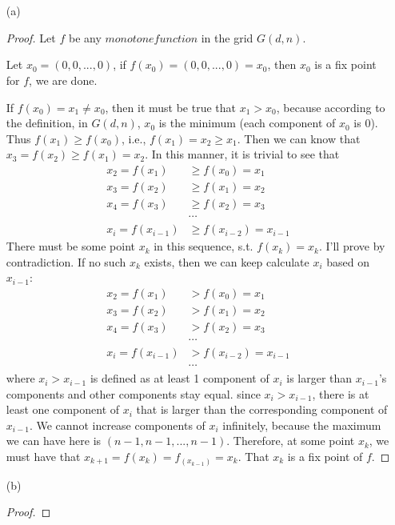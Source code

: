 \documentclass[twoside]{homework}
\begin{document}
\section{}
\begin{enumerate}
	\item [(a)]
	\begin{proof}
		Let $f$ be any $monotone function$ in the grid $G(d, n)$.

		Let $x_0 = (0, 0, ...,0)$, if $f(x_0) = (0,0,...,0) = x_0$, then $x_0$ is a fix point for $f$, we are done.

		If $f(x_0) = x_1 \neq x_0$, then it must be true that $x_1 > x_0$, because according to the definition, in $G(d, n)$, $x_0$ is the minimum (each component of $x_0$ is 0). Thus $f(x_1) \geq f(x_0)$, i.e., $f(x_1) = x_2 \geq x_1$. Then we can know that $x_3 = f(x_2) \geq f(x_1) = x_2$. In this manner, it is trivial to see that
		\begin{align*}
			x_2 = f(x_1) &\geq f(x_0) = x_1 \\
			x_3 = f(x_2) &\geq f(x_1) = x_2 \\
			x_4 = f(x_3) &\geq f(x_2) = x_3 \\
				&\cdots \\
			x_i = f(x_{i-1})&\geq f(x_{i-2}) = x_{i-1}
		\end{align*}
		There must be some point $x_k$ in this sequence, s.t. $f(x_k) = x_k$. I'll prove by contradiction. If no such $x_k$ exists, then we can keep calculate $x_i$ based on $x_{i-1}$:
		\begin{align*}
			x_2 = f(x_1) &> f(x_0) = x_1 \\
			x_3 = f(x_2) &> f(x_1) = x_2 \\
			x_4 = f(x_3) &> f(x_2) = x_3 \\
				&\cdots \\
			x_i = f(x_{i-1})&> f(x_{i-2}) = x_{i-1} \\
			&\cdots
		\end{align*}
		where $x_i> x_{i-1}$ is defined as at least 1 component of $x_i$ is larger than $x_{i-1}$'s components and other components stay equal.
		since $x_i > x_{i-1}$, there is at least one component of $x_i$ that is larger than the corresponding component of $x_{i-1}$. We cannot increase components of $x_i$ infinitely, because the maximum we can have here is $(n-1, n-1, ..., n-1)$. Therefore, at some point $x_k$, we must have that $x_{k+1} = f(x_k) = f_(x_{k-1}) = x_k$. That $x_k$ is a fix point of $f$.
		\end{proof}
		\item [(b)] \begin{proof}

\end{proof}
\end{enumerate}
\end{document}
